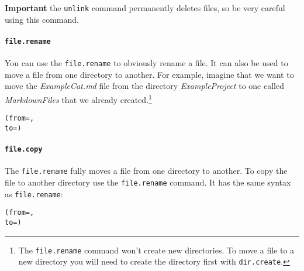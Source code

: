 \noindent \textbf{Important} the \texttt{unlink} command permanently deletes files, so be very careful using this command.

\paragraph{{\tt{file.rename}}}

You can use the \texttt{file.rename} to obviously rename a file. It can also be used to move a file from one directory to another. For example, imagine that we want to move the \emph{ExampleCat.md} file from the directory \emph{ExampleProject} to one called \emph{MarkdownFiles} that we already created.\footnote{The \texttt{file.rename} command won't create new directories. To move a file to a new directory you will need to create the directory first with \texttt{dir.create}.}

\begin{knitrout}
\color{fgcolor}\begin{kframe}
\begin{alltt}
(from = , 
            to = )
\end{alltt}
\end{kframe}
\end{knitrout}


\paragraph{{\tt{file.copy}}}

The \texttt{file.rename} fully moves a file from one directory to another. To copy the file to another directory use the \texttt{file.rename} command. It has the same syntax as \texttt{file.rename}:

\begin{knitrout}
\color{fgcolor}\begin{kframe}
\begin{alltt}
(from = , 
            to = )
\end{alltt}
\end{kframe}
\end{knitrout}


